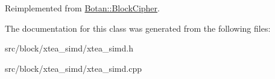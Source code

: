 Reimplemented from \hyperlink{classBotan_1_1BlockCipher_a635a1c3ed1084be78cf1b9e655ab1465}{Botan\-::\-Block\-Cipher}.



The documentation for this class was generated from the following files\-:\begin{DoxyCompactItemize}
\item 
src/block/xtea\-\_\-simd/xtea\-\_\-simd.\-h\item 
src/block/xtea\-\_\-simd/xtea\-\_\-simd.\-cpp\end{DoxyCompactItemize}
